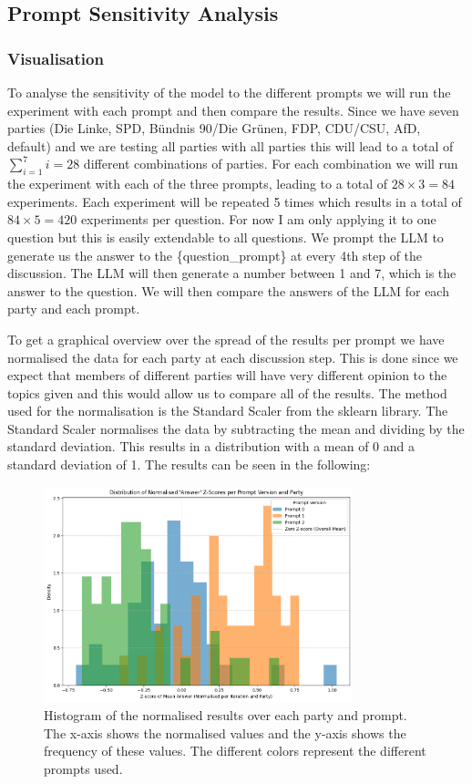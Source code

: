\documentclass[12pt]{article}
\begin{document}
\subsection{Prompt Sensitivity Analysis}
\subsubsection{Visualisation}
To analyse the sensitivity of the model to the different prompts we will run the experiment with each prompt and then compare the results. Since we have seven parties (Die Linke, SPD, Bündnis 90/Die Grünen, FDP, CDU/CSU, AfD, default) and we are testing all parties with all parties this will lead to a total of  $\sum_{i=1}^{7} i = 28$ different combinations of parties. For each combination we will run the experiment with each of the three prompts, leading to a total of $28 \times 3 = 84$ experiments. Each experiment will be repeated 5 times which results in a total of $84 \times 5 = 420$ experiments per question. For now I am only applying it to one question but this is easily extendable to all questions. We prompt the LLM to generate us the answer to the \{question\_prompt\} at every 4th step of the discussion. The LLM will then generate a number between 1 and 7, which is the answer to the question. We will then compare the answers of the LLM for each party and each prompt.

To get a graphical overview over the spread of the results per prompt we have normalised the data for each party at each discussion step. This is done since we expect that members of different parties will have very different opinion to the topics given and this would allow us to compare all of the results. The method used for the normalisation is the Standard Scaler from the sklearn library. The Standard Scaler normalises the data by subtracting the mean and dividing by the standard deviation. This results in a distribution with a mean of 0 and a standard deviation of 1. The results can be seen in the following: 

\begin{figure}[h!]
\centering
\includegraphics[width=0.8\textwidth]{img/normalised_results.png}
\caption{Histogram of the normalised results over each party and prompt. The x-axis shows the normalised values and the y-axis shows the frequency of these values. The different colors represent the different prompts used.}
\label{fig:normalised_results} 
\end{figure}
\end{document}
